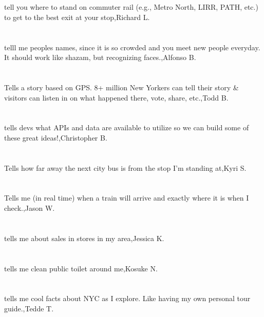\section{} tell you where to stand on commuter rail (e.g., Metro North, LIRR, PATH, etc.) to get to the best exit at your stop,Richard L.
\section{}telll me peoples names, since  it is so crowded and you meet new people everyday. It should work like  shazam, but recognizing faces.,Alfonso B.
\section{}Tells a story based on GPS. 8+ million New Yorkers can tell their story \& visitors can listen in on what happened there, vote, share, etc.,Todd B.
\section{}tells devs what APIs and data are available to utilize so we can build some of these great ideas!,Christopher B.
\section{}Tells how far away the next city bus is from the stop I'm standing at,Kyri S.
\section{}Tells me (in real time) when a train will arrive and exactly where it is when I check.,Jason W.
\section{}tells me about sales in stores in my area,Jessica K.
\section{}tells me clean public toilet around me,Kosuke N.
\section{}tells me cool facts about NYC as I explore. Like having my own personal tour guide.,Tedde T.
